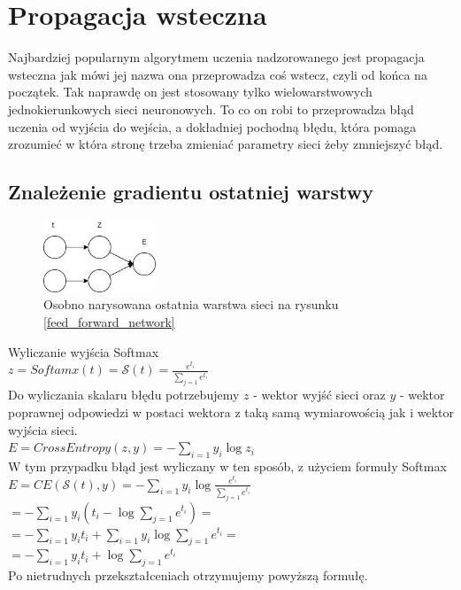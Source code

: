 \documentclass{article}
\begin{document}
\section{Propagacja wsteczna}
Najbardziej popularnym algorytmem uczenia nadzorowanego jest propagacja wsteczna jak mówi jej nazwa ona przeprowadza coś wstecz, czyli od końca na początek. Tak naprawdę on jest stosowany tylko wielowarstwowych jednokierunkowych sieci neuronowych. To co on robi to przeprowadza błąd uczenia od wyjścia do wejścia, a dokładniej pochodną błędu, która pomaga zrozumieć w która stronę trzeba zmieniać parametry sieci żeby zmniejszyć błąd. \cite{nn_jozef}

\subsection{Znależenie gradientu ostatniej warstwy}
\begin{figure}[H]
	\centering
	\includegraphics[width=0.3\textwidth,keepaspectratio=true]{feed_forward_error}
	\caption{Osobno narysowana ostatnia warstwa sieci na rysunku \ref{feed_forward_network}}
	\label{feed_forward_error}
\end{figure}

Wyliczanie wyjścia Softmax\\
$z = Softamx(t) = \mathcal{S}(t)= \frac{e^{t_i}}{\sum_{j=1}e^{t_i}}$ \\

Do wyliczania skalaru błędu potrzebujemy $z$ - wektor wyjść sieci oraz $y$ - wektor poprawnej odpowiedzi w postaci wektora z taką samą wymiarowością jak i wektor wyjścia sieci.\\
$E = CrossEntropy(z, y) = -\sum_{i=1}y_i\log z_i$\\

W tym przypadku błąd jest wyliczany w ten sposób, z użyciem formuły Softmax\\
$E = CE(\mathcal{S}(t),y)=-\sum_{i=1}y_i\log\frac{e^{t_i}}{\sum_{j=1}e^{t_i}}$\\
$= -\sum_{i=1}y_i(t_i-\log \sum_{j=1}e^{t_i}) =$\\
$= -\sum_{i=1}y_it_i + \sum_{i=1}y_i\log\sum_{j=1}e^{t_i} =$\\
$= -\sum_{i=1}y_it_i + \log\sum_{j=1}e^{t_i}$\\
Po nietrudnych przekształceniach otrzymujemy powyższą formułę.\\
\end{document}
